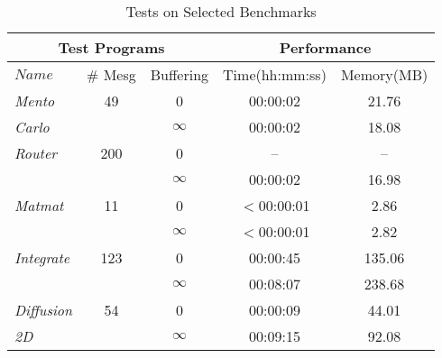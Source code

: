 \begin{table}[t]
\begin{center}
\scriptsize
\caption{Tests on Selected Benchmarks}
\begin{tabular}{|l|c|c|c|c|}
		\hline
         \multicolumn{3}{|c|}{Test Programs} & \multicolumn{2}{|c|}{Performance} \\ \hline
          $Name$&\# Mesg&Buffering&Time(hh:mm:ss)&Memory(MB) \\ \hline
	 \textit{Mento} & 49 & 0 & 00:00:02 & 21.76\\
          \textit{Carlo}    & & $\infty$ & 00:00:02 & 18.08 \\ \hline
	 \textit{Router}   & 200 & 0 & -- & --\\
          	      & & $\infty$ & 00:00:02 & 16.98 \\ \hline
	  \textit{Matmat} & 11 & 0 & $<$00:00:01 & 2.86\\
          	      & &  $\infty$ & $<$00:00:01 & 2.82\\ \hline
	 \textit{Integrate}  & 123 & 0 & 00:00:45 & 135.06 \\
          	      & & $\infty$ & 00:08:07 & 238.68\\ \hline
	  \textit{Diffusion}  & 54 & 0 & 00:00:09 & 44.01 \\
           \textit{2D} &  & $\infty$ & 00:09:15 & 92.08\\ \hline          
          		\end{tabular}
\end{center}
\end{table}


